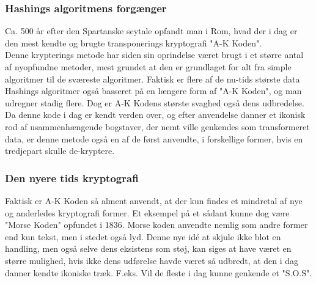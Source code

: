 \subsubsection{Hashings algoritmens forgænger}
Ca. 500 år efter den Spartanske scytale opfandt man i Rom, hvad der i dag er den mest kendte og brugte transponerings kryptografi "A-K Koden".
\cite{TheSecretLanguage}\\
Denne krypterings metode har siden sin oprindelse været brugt i et større antal af nyopfundne metoder, 
mest grundet at den er grundlaget for alt fra simple algoritmer til de sværeste algoritmer. 
Faktisk er flere af de nu-tids største data Hashings algoritmer også basseret på en længere form af "A-K Koden", og man udregner stadig flere. 
Dog er A-K Kodens største svaghed også dens udbredelse. Da denne kode i dag er kendt verden over, og efter anvendelse danner et ikonisk rod af usammenhængende bogstaver, der nemt ville genkendes som transformeret data, er denne metode også en af de først anvendte, i forskellige former, hvis en tredjepart skulle de-kryptere.

\subsubsection{Den nyere tids kryptografi}
Faktisk er A-K Koden så alment anvendt, at der kun findes et mindretal af nye og anderledes kryptografi former. Et eksempel på et sådant kunne dog være "Morse Koden" opfundet i 1836. Morse koden anvendte nemlig som andre former end kun tekst, men i stedet også lyd. 
\cite{Telegraphing} Denne nye idé at skjule ikke blot en handling, men også selve dens eksistens som støj, kan siges at have været en større mulighed, hvis ikke dens udførelse havde været så udbredt, at den i dag danner kendte ikoniske træk. F.eks. Vil de fleste i dag kunne genkende et "S.O.S".

